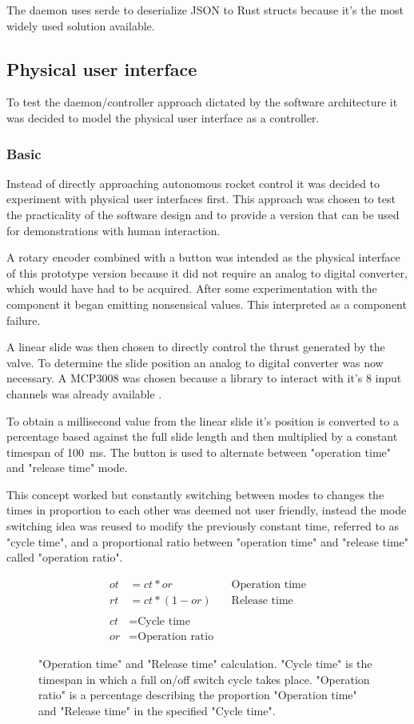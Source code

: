 The daemon uses serde \cite{serde} to deserialize JSON to Rust structs because it's the most widely used solution available.

\subsection{Physical user interface}
To test the daemon/controller approach dictated by the software architecture it was decided to model the physical user interface as a controller.

\subsubsection{Basic}
Instead of directly approaching autonomous rocket control it was decided to experiment with physical user interfaces first. This approach was chosen to test the practicality of the software design and to provide a version that can be used for demonstrations with human interaction. 

A rotary encoder \cite{rotary-encoder} combined with a button was intended as the physical interface of this prototype version because it did not require an analog to digital converter, which would have had to be acquired. After some experimentation with the component it began emitting nonsensical values. This interpreted as a component failure. 

A linear slide was then chosen to directly control the thrust generated by the valve. To determine the slide position an analog to digital converter was now necessary. A MCP3008 \cite{mcp3008} was chosen because a library \cite{mcp3008-library} to interact with it's 8 input channels was already available . 

To obtain a millisecond value from the linear slide it's position is converted to a percentage based against the full slide length and then multiplied by a constant timespan of \SI{100}{\milli\second}. The button is used to alternate between "operation time" and "release time" mode. 

This concept worked but constantly switching between modes to changes the times in proportion to each other was deemed not user friendly, instead the mode switching idea was reused to modify the previously constant time, referred to as "cycle time", and a proportional ratio between "operation time" and "release time" called "operation ratio".

\begin{figure}[h]
\begin{align*}
    ot &=ct * or && \text{Operation time} \\
    rt &=ct * (1 - or) && \text{Release time} \\ \\
    ct &= \text{Cycle time} \\
    or &= \text{Operation ratio}
\end{align*}
\caption{"Operation time" and "Release time" calculation. "Cycle time" is the timespan in which a full on/off switch cycle takes place. "Operation ratio" is a percentage describing the proportion "Operation time" and "Release time" in the specified "Cycle time".}
\end{figure}

